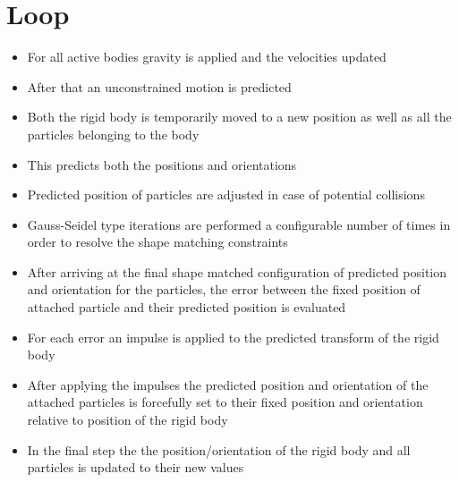 \section{Loop}
\begin{itemize}
\item For all active bodies gravity is applied and the velocities updated
\item After that an unconstrained motion is predicted
\item Both the rigid body is temporarily moved to a new position as well as all the particles belonging to the body
\item This predicts both the positions and orientations
\item Predicted position of particles are adjusted in case of potential collisions
\item Gauss-Seidel type iterations are performed a configurable number of times in order to resolve the shape matching constraints
\item After arriving at the final shape matched configuration of predicted position and orientation for the particles, the error between the fixed position of attached particle and their predicted position is evaluated
\item For each error an impulse is applied to the predicted transform of the rigid body
\item After applying the impulses the predicted position and orientation of the attached particles is forcefully set to their fixed position and orientation relative to position of the rigid body
\item In the final step the the position/orientation of the rigid body and all particles is updated to their new values
\end{itemize}